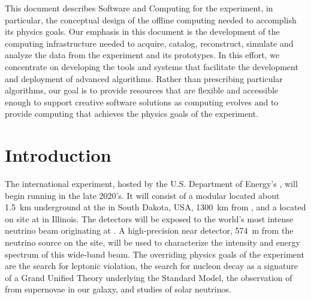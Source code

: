\documentclass[../main-v1.tex]{subfiles}
\begin{document}
This document describes Software and Computing for the  experiment, in particular, the conceptual design of the offline computing needed to accomplish its physics goals. Our emphasis in this document is the development of the computing infrastructure needed to acquire, catalog, reconstruct, simulate and analyze the data from the  experiment and its prototypes. In this effort, we concentrate on developing the tools and systems that facilitate the development and deployment of advanced algorithms. %
Rather than prescribing particular algorithms, our goal is to provide resources that are flexible and accessible enough to support creative software solutions as  computing evolves
and to provide computing that achieves the physics goals of the  experiment. %

\section{Introduction }\label{sec:intro-introduction}

The international  experiment, hosted by the U.S. Department of Energy's ,  will begin running in the late 2020's. It will consist of a modular  located about \SI{1.5}{km} underground at the  in South Dakota, USA, \SI{1300}{\km} from , and a  located on site at  in Illinois. The  detectors will be exposed to the world's most intense neutrino beam originating at . A high-precision near detector, \SI{574}{m} from the neutrino source on the  site, will be used to characterize the intensity and energy spectrum of this wide-band beam. The overriding physics goals of the  experiment are the search for leptonic  violation, the search for nucleon decay as a signature of a Grand Unified Theory underlying the Standard Model,  the observation of   from supernovae in our galaxy, and studies of solar neutrinos.  %
\end{document}
